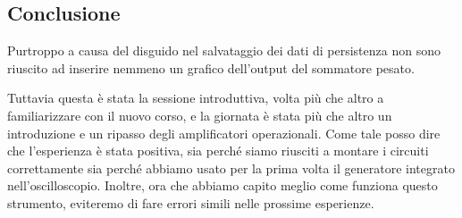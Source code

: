 \subsection{Conclusione}

Purtroppo a causa del disguido nel salvataggio dei dati di persistenza non sono
riuscito ad inserire nemmeno un grafico dell'output del sommatore pesato.

Tuttavia questa è stata la sessione introduttiva, volta più che altro a familiarizzare
con il nuovo corso, e la giornata è stata più che altro un introduzione e
un ripasso degli amplificatori operazionali. Come tale posso dire che l'esperienza
è stata positiva, sia perché siamo riusciti a montare i circuiti correttamente
sia perché abbiamo usato per la prima volta il generatore integrato nell'oscilloscopio.
Inoltre, ora che abbiamo capito meglio come funziona questo strumento,
eviteremo di fare errori simili nelle prossime esperienze.
